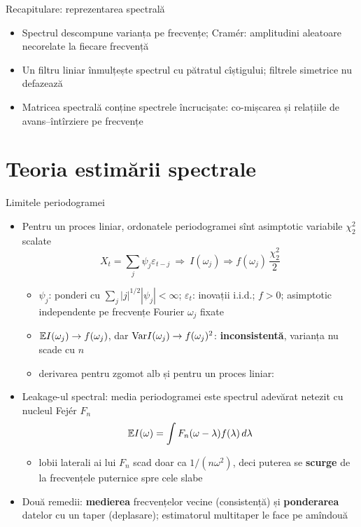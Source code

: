 \begin{frame}{Recapitulare: reprezentarea spectrală}
\itemsize{\small}
\begin{itemize}
    \item Spectrul descompune varianța pe frecvențe; Cramér: amplitudini aleatoare necorelate la fiecare frecvență
    \item Un filtru liniar înmulțește spectrul cu pătratul cîștigului; filtrele simetrice nu defazează
    \item Matricea spectrală conține spectrele încrucișate: co-mișcarea și relațiile de avans--întîrziere pe frecvențe
\end{itemize}
\end{frame}


\section{Teoria estimării spectrale}

\begin{frame}{Limitele periodogramei}
\itemsize{\small}
\begin{itemize}
    \item Pentru un proces liniar, ordonatele periodogramei sînt asimptotic variabile $\chi^2_2$ scalate 
    \[ X_t = \sum_j\psi_j\varepsilon_{t-j} \ \Rightarrow\ I(\omega_j) \Rightarrow f(\omega_j)\,\frac{\chi^2_2}{2} \]
    \begin{itemize}
        \item $\psi_j$: ponderi cu $\sum_j|j|^{1/2}|\psi_j| < \infty$; $\varepsilon_t$: inovații i.i.d.; $f > 0$; asimptotic independente pe frecvențe Fourier $\omega_j$ fixate
        \item $\mathbb{E} I(\omega_j) \to f(\omega_j)$, dar $\text{Var} I(\omega_j) \to f(\omega_j)^2$: \textbf{inconsistentă}, varianța nu scade cu $n$
        \item derivarea pentru zgomot alb și pentru un proces liniar:   %
    \end{itemize}
    \item Leakage-ul spectral: media periodogramei este spectrul adevărat netezit cu nucleul Fejér $F_n$
    \[ \mathbb{E} I(\omega) = \int F_n(\omega - \lambda)f(\lambda)\,d\lambda \]
    \begin{itemize}
        \item lobii laterali ai lui $F_n$ scad doar ca $1/(n\omega^2)$, deci puterea se \textbf{scurge} de la frecvențele puternice spre cele slabe
    \end{itemize}
    \item Două remedii: \textbf{medierea} frecvențelor vecine (consistență) și \textbf{ponderarea} datelor cu un taper (deplasare); estimatorul multitaper le face pe amîndouă
\end{itemize}
\end{frame}

